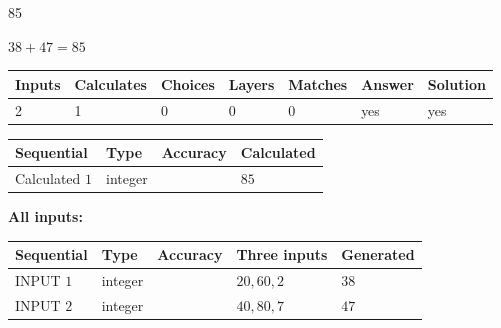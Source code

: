 \documentclass{ctexart}
\begin{document}
 

85
 
 
\noindent{}
 
 

 
 
 
\noindent{}
 
 

$ %
38 +  %
47=   %
85$
 
 
\noindent{}
 
 

 
   
   
   
   
\noindent\begin{tabular}{|l|l|l|l|l|l|l|}
 \hline
Inputs & Calculates & Choices & Layers & Matches & Answer & Solution \\ \hline
 2  & 
 1  & 
 0
  & 
 0  & 
 0  & 
  yes & 
  yes 
  \\ \hline
 \end{tabular}
   
   
   
   
\noindent{}
   
   
  
  
\noindent\begin{tabular}{|l|l|l|l|}
\hline
 Sequential & Type & Accuracy & Calculated \\ 
\hline
 
 
  Calculated $  1 $ & integer &  & 
  $ 85 $ 
 \\  \hline  
 \end{tabular}
   
   
   
   
\noindent\vspace{0.1in}\hspace{-0.08in} {\textbf{\Large{All inputs: }}}
   
   
  
  
\noindent\begin{tabular}{|l|l|l|l|l|}
\hline
 Sequential & Type & Accuracy & Three inputs & Generated \\ 
\hline
 
 
  INPUT $  1 $ & integer &  & $
 20
 , 
 60
 , 
 2
 $ & $ 38 $ 
 \\  \hline  
 
 
  INPUT $  2 $ & integer &  & $
 40
 , 
 80
 , 
 7
 $ & $ 47 $ 
 \\  \hline  
 \end{tabular}
   
\end{document}
